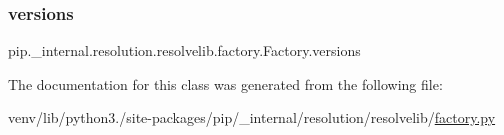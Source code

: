 \subsubsection{\texorpdfstring{versions}{versions}}
{\footnotesize\ttfamily pip.\+\_\+internal.\+resolution.\+resolvelib.\+factory.\+Factory.\+versions\hspace{0.3cm}{\ttfamily [static]}}



The documentation for this class was generated from the following file\+:\begin{DoxyCompactItemize}
\item 
venv/lib/python3./site-\/packages/pip/\+\_\+internal/resolution/resolvelib/\hyperlink{factory_8py}{factory.\+py}\end{DoxyCompactItemize}
